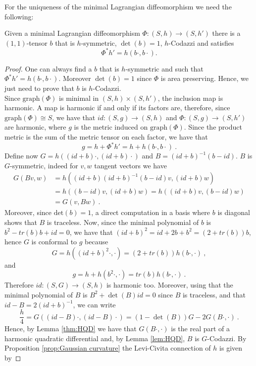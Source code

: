 For the uniqueness of the minimal Lagrangian diffeomorphism we need the following:
\begin{lemma} \label{lem:Lagrangian shit}
    Given a minimal Lagrangian diffeomorphism $\Phi : (S,h) \to (S,h')$ there is a $(1,1)$-tensor $b$ that is $h$-symmetric, $\det(b)=1$, $h$-Codazzi and satisfies
    \[
        \Phi^* h' = h(b \cdot, b \cdot) .
    \]
\end{lemma}
\begin{proof}
    One can always find a $b$ that is $h$-symmetric and such that $\Phi^* h' = h(b \cdot, b \cdot)$. Moreover $\det(b)=1$ since $\Phi$ is area preserving. Hence, we just need to prove that $b$ is $h$-Codazzi.\\
    Since $\text{graph}(\Phi)$ is minimal in $(S,h) \times (S,h')$, the inclusion map is harmonic. A map is harmonic if and only if its factors are, therefore, since $\text{graph}(\Phi) \cong S$, we have that $id:(S,g) \to (S,h)$ and $\Phi:(S,g)\to (S,h')$ are harmonic, where $g$ is the metric induced on $\text{graph}(\Phi)$.
    Since the product metric is the sum of the metric tensor on each factor, we have that
    \[
        g = h + \Phi^* h' = h + h(b \cdot, b \cdot) \ .
    \]
    Define now $G = h((id+b)\cdot ,(id+b)\cdot )$ and $B = (id+b)^{-1}(b-id)$.
    $B$ is $G$-symmetric, indeed for $v,w$ tangent vectors we have
    \[
    \begin{split}
        G(B v,w) & = h((id + b) (id + b)^{-1} (b-id) v , (id + b)w) \\
        & = h((b-id) v , (id + b)w) = h((id + b) v , (b-id)w) \\
        & = G(v, B w) \ .
    \end{split}
    \]
    Moreover, since $\text{det}(b)=1$, a direct computation in a basis where $b$ is diagonal shows that $B$ is traceless. 
    Now, since the minimal polynomial of $b$ is $b^2 - tr(b)b + id = 0$, we have that $(id+b)^2=id+2b+b^2 = (2 + tr(b))b$, hence $G$ is conformal to $g$ because
    \[
        G= h((id+b)^2 \cdot, \cdot) = (2+tr(b))h(b \cdot , \cdot) \ ,
    \]
    and
    \[
        g= h + h(b^2 \cdot,\cdot) = tr(b)h(b\cdot, \cdot) \ .
    \]
    Therefore $id: (S,G)\to (S,h)$ is harmonic too.
    Moreover, using that the minimal polynomial of $B$ is $B^2 + \det(B)id=0$ since $B$ is traceless, and that $id-B = 2(id+b)^{-1}$, we can write
    \[
        \frac{h}{4} = G((id-B) \cdot, (id-B) \cdot) = (1-\det(B))G - 2G(B \cdot , \cdot) \ .
    \]
    Hence, by Lemma \ref{thm:HQD} we have that $G(B\cdot, \cdot)$ is the real part of a harmonic quadratic differential and, by Lemma \ref{lem:HQD}, $B$ is $G$-Codazzi. By Proposition \ref{prop:Gaussian curvature} the Levi-Civita connection of $h$ is given by

\end{proof}
